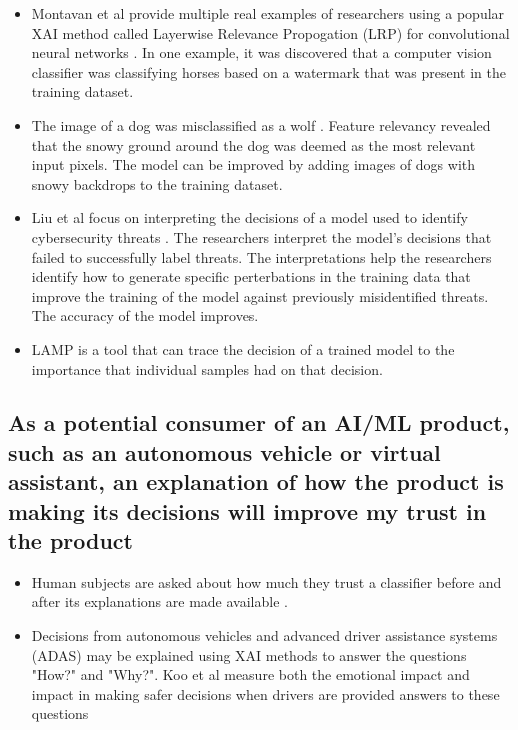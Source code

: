 \documentclass{IEEEtran}
\begin{document}
\begin{itemize}
    \item Montavan et al provide multiple real examples of researchers using a popular XAI method called Layerwise Relevance Propogation (LRP) for convolutional neural networks \cite{MONTAVON20181}.  In one example, it was discovered that a computer vision classifier was classifying horses based on a watermark that was present in the training dataset.
    \item The image of a dog was misclassified as a wolf \cite{Ribeiro:2016:WIT:2939672.2939778}.  Feature relevancy revealed that the snowy ground around the dog was deemed as the most relevant input pixels.  The model can be improved by adding images of dogs with snowy backdrops to the training dataset.
    \item Liu et al focus on interpreting the decisions of a model used to identify cybersecurity threats \cite{Liu:2018:ADM:3219819.3220027}.  The researchers interpret the model's decisions that failed to successfully label threats.  The interpretations help the researchers identify how to generate specific perterbations in the training data that improve the training of the model against previously misidentified threats.  The accuracy of the model improves.
    \item LAMP is a tool that can trace the decision of a trained model to the importance that individual samples had on that decision. \cite{Ma2017}
\end{itemize}

\subsection{As a potential consumer of an AI/ML product, such as an autonomous vehicle or virtual assistant, an explanation of how the product is making its decisions will improve my trust in the product}

\begin{itemize}
    \item Human subjects are asked about how much they trust a classifier before and after its explanations are made available \cite{Ribeiro:2016:WIT:2939672.2939778}.  
    \item Decisions from autonomous vehicles and advanced driver assistance systems (ADAS) may be explained using XAI methods to answer the questions "How?" and "Why?".  Koo et al measure both the emotional impact and impact in making safer decisions when drivers are provided answers to these questions \cite{Koo2015}
\end{itemize}
\end{document}

